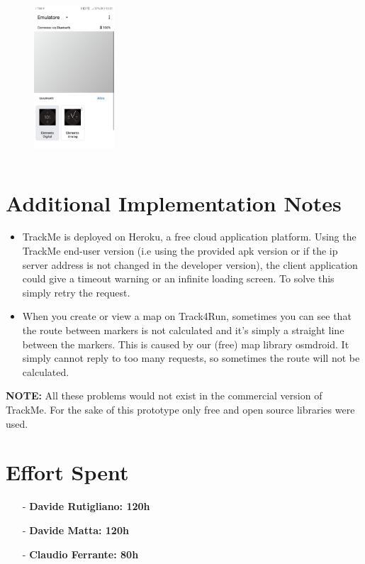 \documentclass[a4paper]{article}
\begin{document}
\begin{itemize}
\begin{figure}[!htpb]
    \includegraphics[width=30mm, height=60mm]{ITD/images/wearos4.jpeg}
    \end{figure}
\end{itemize}

\newpage

\section{Additional Implementation Notes}
\begin{itemize}
\item TrackMe is deployed on Heroku, a free cloud application platform. Using the TrackMe end-user version (i.e using the provided apk version or if the ip server address is not changed in the developer version), the client application could give a timeout warning or an infinite loading screen. To solve this simply retry the request.
\item When you create or view a map on Track4Run, sometimes you can see that the route between markers is not calculated and it's simply a straight line between the markers. This is caused by our (free) map library osmdroid. It simply cannot reply to too many requests, so sometimes the route will not be calculated. 
\end{itemize}
\textbf{NOTE:} All these problems would not exist in the commercial version of TrackMe. For the sake of this prototype only free and open source libraries were used.
\newpage
\section{Effort Spent}
    \begin{itemize}
        \item[-] \textbf{Davide Rutigliano: 120h}
        
        \item[-] \textbf{Davide Matta: 120h}
        
        \item[-] \textbf{Claudio Ferrante: 80h}
    \end{itemize}
\end{document}

